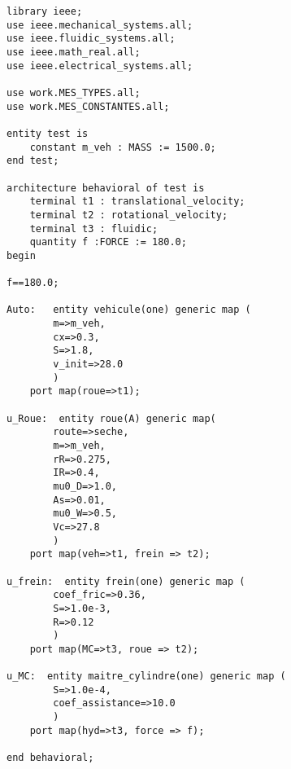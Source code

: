 \begin{verbatim}
library ieee;
use ieee.mechanical_systems.all;
use ieee.fluidic_systems.all;
use ieee.math_real.all;
use ieee.electrical_systems.all;

use work.MES_TYPES.all;
use work.MES_CONSTANTES.all;

entity test is
    constant m_veh : MASS := 1500.0;
end test;

architecture behavioral of test is 
    terminal t1 : translational_velocity;
    terminal t2 : rotational_velocity;
    terminal t3 : fluidic;
    quantity f :FORCE := 180.0;
begin 

f==180.0;

Auto: 	entity vehicule(one) generic map (
        m=>m_veh,
        cx=>0.3,
        S=>1.8,
        v_init=>28.0
        ) 
    port map(roue=>t1);

u_Roue:  entity roue(A) generic map(
        route=>seche,
        m=>m_veh, 
        rR=>0.275, 
        IR=>0.4, 
        mu0_D=>1.0, 
        As=>0.01, 
        mu0_W=>0.5, 
        Vc=>27.8
        )
    port map(veh=>t1, frein => t2);

u_frein:  entity frein(one) generic map (
        coef_fric=>0.36,
        S=>1.0e-3, 
        R=>0.12
        )
    port map(MC=>t3, roue => t2);

u_MC:  entity maitre_cylindre(one) generic map (
        S=>1.0e-4,
        coef_assistance=>10.0
        )
    port map(hyd=>t3, force => f);

end behavioral; 
\end{verbatim}